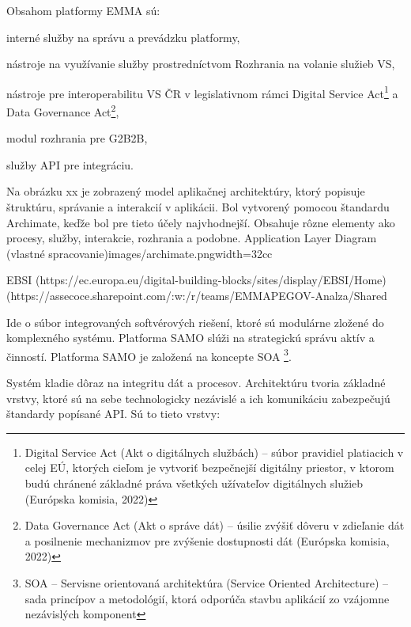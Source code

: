 Obsahom platformy EMMA sú:

\startitemize
\item{interné služby na správu a prevádzku platformy,}
\item{nástroje na využívanie služby prostredníctvom Rozhrania na volanie služieb VS,}
\item{nástroje pre interoperabilitu VS ČR v legislativnom rámci Digital Service Act\footnote{Digital Service Act (Akt o digitálnych službách) -- súbor pravidiel platiacich v celej EÚ, ktorých cieľom je vytvoriť bezpečnejší digitálny priestor, v ktorom budú chránené základné práva všetkých užívateľov digitálnych služieb \scr(Európska komisia, 2022)} a Data Governance Act\footnote{Data Governance Act (Akt o správe dát) -- úsilie zvýšiť dôveru v zdieľanie dát a posilnenie mechanizmov pre zvýšenie dostupnosti dát \scr(Európska komisia, 2022)},}
\item{modul rozhrania pre G2B2B,}
\item{služby API pre integráciu.}
\stopitemize 

Na obrázku xx je zobrazený model aplikačnej architektúry, ktorý popisuje štruktúru, správanie a interakcií v aplikácii. Bol vytvorený pomocou štandardu Archimate, keďže bol pre tieto účely najvhodnejší. Obsahuje rôzne elementy ako procesy, služby, interakcie, rozhrania a podobne.
{Application Layer Diagram (vlastné spracovanie)}{images/archimate.png}{width=32cc}

\TODO EBSI (https://ec.europa.eu/digital-building-blocks/sites/display/EBSI/Home) (https://assecoce.sharepoint.com/:w:/r/teams/EMMAPEGOV-Analza/Shared%

Ide o súbor integrovaných softvérových riešení, ktoré sú modulárne zložené do komplexného systému. Platforma SAMO slúži na strategickú správu aktív a činností. Platforma SAMO je založená na koncepte SOA \footnote{SOA -- Servisne orientovaná architektúra (Service Oriented Architecture) -- sada princípov a metodológií, ktorá odporúča stavbu aplikácií zo vzájomne nezávislých komponent}. %


Systém kladie dôraz na integritu dát a procesov. Architektúru tvoria základné vrstvy, ktoré sú na sebe technologicky nezávislé a ich komunikáciu zabezpečujú štandardy popísané API. Sú to tieto vrstvy:


